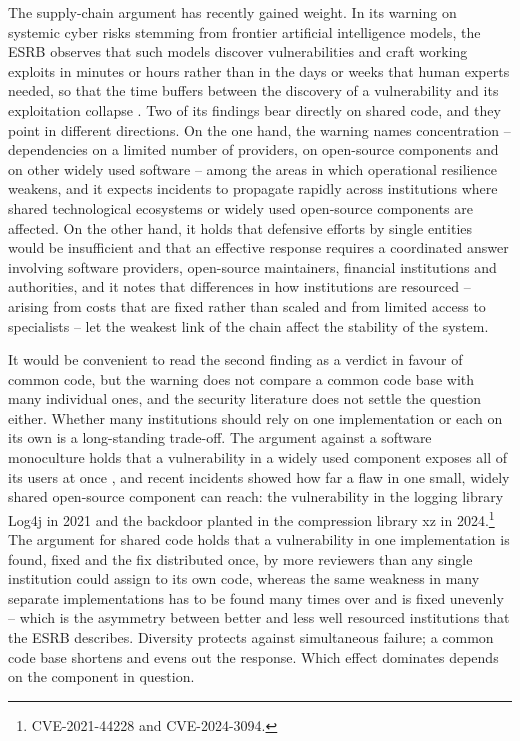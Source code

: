 \documentclass[a4paper, 11pt]{report}
\begin{document}
The supply-chain argument has recently gained weight. In its warning on systemic cyber risks stemming from frontier artificial intelligence models, the ESRB observes that such models discover vulnerabilities and craft working exploits in minutes or hours rather than in the days or weeks that human experts needed, so that the time buffers between the discovery of a vulnerability and its exploitation collapse \parencite{ESRB.2026}. Two of its findings bear directly on shared code, and they point in different directions. On the one hand, the warning names concentration -- dependencies on a limited number of providers, on open-source components and on other widely used software -- among the areas in which operational resilience weakens, and it expects incidents to propagate rapidly across institutions where shared technological ecosystems or widely used open-source components are affected. On the other hand, it holds that defensive efforts by single entities would be insufficient and that an effective response requires a coordinated answer involving software providers, open-source maintainers, financial institutions and authorities, and it notes that differences in how institutions are resourced -- arising from costs that are fixed rather than scaled and from limited access to specialists -- let the weakest link of the chain affect the stability of the system.

It would be convenient to read the second finding as a verdict in favour of common code, but the warning does not compare a common code base with many individual ones, and the security literature does not settle the question either. Whether many institutions should rely on one implementation or each on its own is a long-standing trade-off. The argument against a software monoculture holds that a vulnerability in a widely used component exposes all of its users at once \parencite{Geer.2003}, and recent incidents showed how far a flaw in one small, widely shared open-source component can reach: the vulnerability in the logging library Log4j in 2021 and the backdoor planted in the compression library xz in 2024.\footnote{CVE-2021-44228 and CVE-2024-3094.} The argument for shared code holds that a vulnerability in one implementation is found, fixed and the fix distributed once, by more reviewers than any single institution could assign to its own code, whereas the same weakness in many separate implementations has to be found many times over and is fixed unevenly -- which is the asymmetry between better and less well resourced institutions that the ESRB describes. Diversity protects against simultaneous failure; a common code base shortens and evens out the response. Which effect dominates depends on the component in question.
\end{document}

